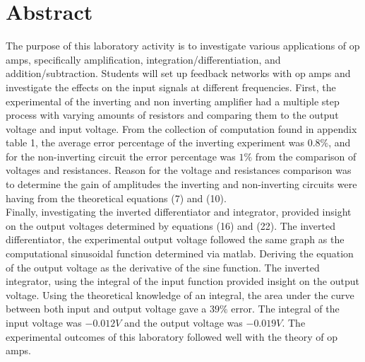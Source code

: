 \documentclass[11pt]{article}
\begin{document}
\section*{Abstract}
The  purpose  of  this  laboratory  activity  is  to  investigate  various  applications  of  op  amps,  specifically amplification, integration/differentiation, and addition/subtraction. Students will set up feedback networks with op amps and investigate the effects on the input signals at different frequencies. First, the experimental of the inverting and non inverting amplifier had a multiple step process with varying amounts of resistors and comparing them to the output voltage and input voltage. From the collection of computation found in appendix table 1, the average error percentage of the inverting experiment was $0.8\%$, and for the non-inverting circuit the error percentage was $1\%$ from the comparison of voltages and resistances. Reason for the voltage and resistances comparison was to determine the gain of amplitudes the inverting and non-inverting circuits were having from the theoretical equations (7) and (10).\\
Finally, investigating the inverted differentiator and integrator, provided insight on the output voltages determined by equations (16) and (22). The inverted differentiator, the experimental output voltage followed the same graph as the computational sinusoidal function determined via matlab. Deriving the equation of the output voltage as the derivative of the sine function. The inverted integrator, using the integral of the input function provided insight on the output voltage. Using the theoretical knowledge of an integral, the area under the curve between both input and output voltage gave a $39\%$ error. The integral of the input voltage was $-0.012V$ and the output voltage was $-0.019V$. The experimental outcomes of this laboratory followed well with the theory of op amps. 
\end{document}
